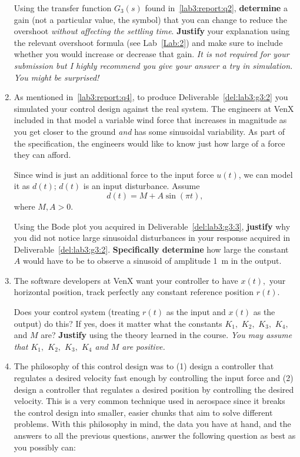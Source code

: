 \begin{deliverable}[label={lab3:report}]
\begin{enumerate}[label={(\arabic*)}]
{      Using the transfer function \(G_3(s)\) found in~\ref{lab3:report:q2}, 
      \textbf{determine} a gain (not a particular value, the symbol) that you can change to reduce the overshoot \emph{without affecting the settling time}.
      \textbf{Justify} your explanation using the relevant overshoot formula (see Lab~\ref{Lab:2}) and make sure to include whether you would increase or decrease that gain.
      \emph{It is not required for your submission but I highly recommend you give your answer a try in simulation. You might be surprised!}
      \label{lab3:report:q4}
    }
    \item{%
      As mentioned in~\ref{lab3:report:q4}, to produce Deliverable~\ref{del:lab3:g3:2} you simulated your control design against the real system.
      The engineers at VenX included in that model a variable wind force that increases in magnitude as you get closer to the ground \emph{and} has some sinusoidal variability.
      As part of the specification, the engineers would like to know just how large of a force they can afford.

      Since wind is just an additional force to the input force \(u(t)\), we can model it as \(d(t)\);
      \(d(t)\) is an input disturbance.
      Assume
      \[
        d(t) = M + A\sin\left(\pi t\right),
      \]
      where \(M, A > 0\).

      Using the Bode plot you acquired in Deliverable~\ref{del:lab3:g3:3},
      \textbf{justify} why you did not notice large sinusoidal disturbances in your response acquired in Deliverable~\ref{del:lab3:g3:2}.
      \textbf{Specifically determine} how large the constant \(A\) would have to be to observe a sinusoid of amplitude \SI{1}{m} in the output.
      \label{lab3:report:q5}
    }
    \item{%
      The software developers at VenX want your controller to have \(x(t),\) your horizontal position, track perfectly any constant reference position \(r(t).\)

      Does your control system (treating \(r(t)\) as the input and \(x(t)\) as the output) do this?
      If yes, does it matter what the constants \(K_1,\) \(K_2,\) \(K_3,\) \(K_4,\) and \(M\) are?
      \textbf{Justify} using the theory learned in the course.
      \emph{You may assume that \(K_1,\) \(K_2,\) \(K_3,\) \(K_4\) and \(M\) are positive.}
      \label{lab3:report:q6}
    }
    \item{%
      The philosophy of this control design was to (1) design a controller that regulates a desired velocity fast enough by controlling the input force and (2) design a controller that regulates a desired position by controlling the desired velocity.
      This is a very common technique used in aerospace since it breaks the control design into smaller, easier chunks that aim to solve different problems.
      With this philosophy in mind, the data you have at hand, and the answers to all the previous questions, answer the following question as best as you possibly can:

}
\end{enumerate}
\end{deliverable}

